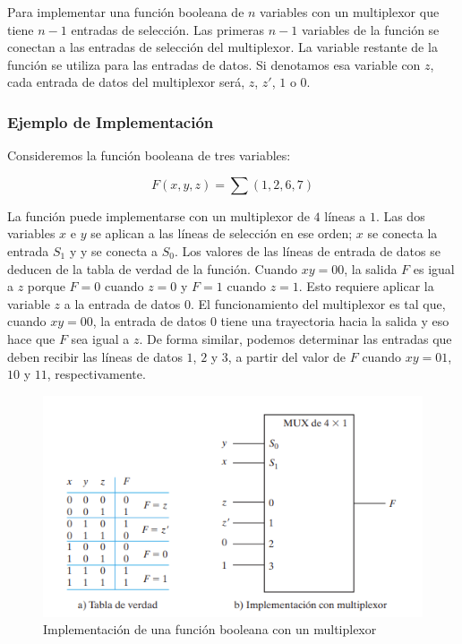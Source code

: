 \begin{mdframed}[backgroundcolor=gray!10,linewidth=0pt]
Para implementar una función booleana de $n$ variables con un multiplexor que tiene $n-1$ entradas de selección. Las primeras $n-1$ variables de la función se conectan a las entradas de selección del multiplexor. La variable restante de la función se utiliza para las entradas de datos. Si denotamos esa variable con $z$, cada entrada de datos del multiplexor será, $z$, $z'$, $1$ o $0$.
\end{mdframed}

\newpage
\subsubsection{Ejemplo de Implementación}
Consideremos la función booleana de tres variables:

\begin{equation*}
    F(x,y,z) = \sum (1,2,6,7)
\end{equation*}

La función puede implementarse con un multiplexor de $4$ líneas a $1$. Las dos variables $x$ e $y$ se aplican a las líneas de selección en ese orden; $x$ se conecta la entrada $S_1$ y y se conecta a $S_0$. Los valores de las líneas de entrada de datos se deducen de la tabla de verdad de la función. Cuando $xy=00$, la salida $F$ es igual a $z$ porque $F=0$ cuando $z=0$ y $F=1$ cuando $z=1$. Esto requiere aplicar la variable $z$ a la entrada de datos $0$. El funcionamiento del multiplexor es tal que, cuando $xy=00$, la entrada de datos $0$ tiene una trayectoria hacia la salida y eso hace que $F$ sea igual a $z$. De forma similar, podemos determinar las entradas que deben recibir las líneas de datos $1$, $2$ y $3$, a partir del valor de $F$ cuando $xy=01$, $10$ y $11$, respectivamente.

\begin{figure}[h]
\centering
\includegraphics[scale=0.9]{img/ej1.png}
\caption{Implementación de una función booleana con un multiplexor}
\end{figure}